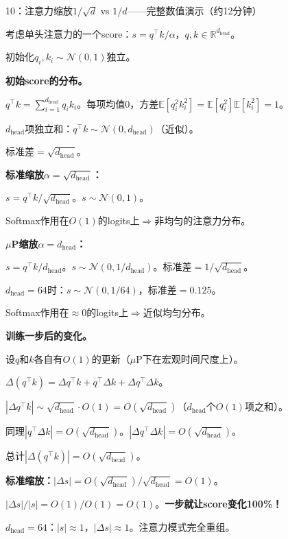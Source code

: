 \documentclass[11pt,a4paper]{article}
\newcommand{\R}{\mathbb{R}}
\newcommand{\E}{\mathbb{E}}
\newcommand{\cN}{\mathcal{N}}
\begin{document}
\begin{handcalc}{10：注意力缩放$1/\sqrt{d}$ vs $1/d$——完整数值演示（约12分钟）}

考虑单头注意力的一个score：$s=q^\top k/\alpha$，$q,k\in\R^{d_{\text{head}}}$。

初始化$q_i,k_i\sim\cN(0,1)$独立。

\tcblower

\textbf{初始score的分布。}

$q^\top k = \sum_{i=1}^{d_{\text{head}}} q_i k_i$。每项均值0，方差$\E[q_i^2 k_i^2]=\E[q_i^2]\E[k_i^2]=1$。

$d_{\text{head}}$项独立和：$q^\top k\sim\cN(0, d_{\text{head}})$（近似）。

标准差$=\sqrt{d_{\text{head}}}$。

\medskip
\textbf{标准缩放$\alpha=\sqrt{d_{\text{head}}}$：}

$s = q^\top k/\sqrt{d_{\text{head}}}$。$s\sim\cN(0,1)$。

Softmax作用在$O(1)$的logits上$\Rightarrow$非均匀的注意力分布。

\medskip
\textbf{$\mu$P缩放$\alpha=d_{\text{head}}$：}

$s = q^\top k/d_{\text{head}}$。$s\sim\cN(0, 1/d_{\text{head}})$。标准差$=1/\sqrt{d_{\text{head}}}$。

$d_{\text{head}}=64$时：$s\sim\cN(0, 1/64)$，标准差$=0.125$。

Softmax作用在$\approx 0$的logits上$\Rightarrow$近似均匀分布。

\bigskip
\textbf{训练一步后的变化。}

设$q$和$k$各自有$O(1)$的更新（$\mu$P下在宏观时间尺度上）。

$\Delta(q^\top k) = \Delta q^\top k + q^\top\Delta k + \Delta q^\top\Delta k$。

$|\Delta q^\top k|\sim\sqrt{d_{\text{head}}}\cdot O(1) = O(\sqrt{d_{\text{head}}})$（$d_{\text{head}}$个$O(1)$项之和）。

同理$|q^\top\Delta k| = O(\sqrt{d_{\text{head}}})$。$|\Delta q^\top\Delta k|=O(\sqrt{d_{\text{head}}})$。

总计$|\Delta(q^\top k)| = O(\sqrt{d_{\text{head}}})$。

\medskip
\textbf{标准缩放：}$|\Delta s| = O(\sqrt{d_{\text{head}}})/\sqrt{d_{\text{head}}} = O(1)$。

$|\Delta s|/|s| = O(1)/O(1) = O(1)$。\textbf{一步就让score变化100\%！}

$d_{\text{head}}=64$：$|s|\approx 1$，$|\Delta s|\approx 1$。注意力模式完全重组。


\end{handcalc}
\end{document}
